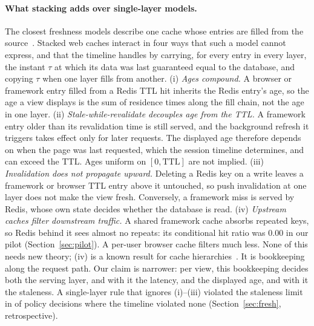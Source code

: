 \documentclass[acmsmall,review,nonacm]{acmart}
\begin{document}
\paragraph{What stacking adds over single-layer models.}
The closest freshness models describe one cache whose entries are filled from the source~\cite{cho2000freshness,gessert2017quaestor,ji2023transparent}. Stacked web caches interact in four ways that such a model cannot express, and that the timeline handles by carrying, for every entry in every layer, the instant $\tau$ at which its data was last guaranteed equal to the database, and copying $\tau$ when one layer fills from another.
(i) \emph{Ages compound.} A browser or framework entry filled from a Redis TTL hit inherits the Redis entry's age, so the age a view displays is the sum of residence times along the fill chain, not the age in one layer.
(ii) \emph{Stale-while-revalidate decouples age from the TTL.} A framework entry older than its revalidation time is still served, and the background refresh it triggers takes effect only for later requests. The displayed age therefore depends on when the page was last requested, which the session timeline determines, and can exceed the TTL. Ages uniform on $[0,\text{TTL}]$ are not implied.
(iii) \emph{Invalidation does not propagate upward.} Deleting a Redis key on a write leaves a framework or browser TTL entry above it untouched, so push invalidation at one layer does not make the view fresh. Conversely, a framework miss is served by Redis, whose own state decides whether the database is read.
(iv) \emph{Upstream caches filter downstream traffic.} A shared framework cache absorbs repeated keys, so Redis behind it sees almost no repeats: its conditional hit ratio was 0.00 in our pilot (Section~\ref{sec:pilot}). A per-user browser cache filters much less.
None of this needs new theory; (iv) is a known result for cache hierarchies~\cite{che2002hierarchical,fofack2014ttl}. It is bookkeeping along the request path. Our claim is narrower: per view, this bookkeeping decides both the serving layer, and with it the latency, and the displayed age, and with it the staleness. A single-layer rule that ignores (i)--(iii) violated the staleness limit in \decCatSingleViol{} of \decCatSingleN{} policy decisions where the timeline violated none (Section~\ref{sec:fresh}, retrospective).
\end{document}
